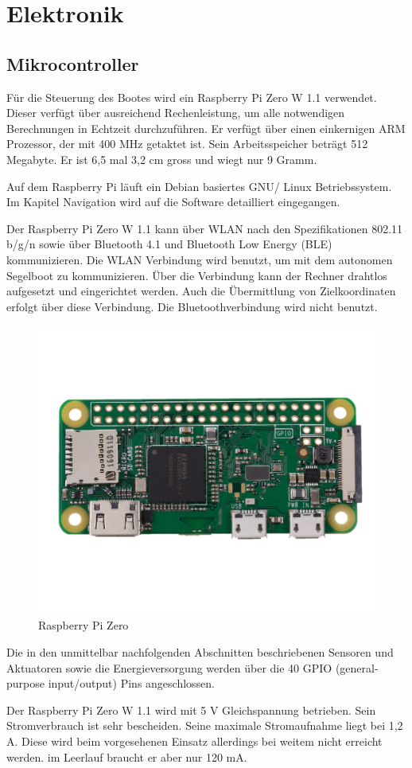 

\chapter{Elektronik}
\label{chap:elektronik}
\section{Mikrocontroller }
Für die Steuerung des Bootes wird ein Raspberry Pi Zero W 1.1 verwendet. Dieser verfügt über ausreichend Rechenleistung, um alle notwendigen Berechnungen in Echtzeit durchzuführen. Er verfügt über einen einkernigen ARM Prozessor, der mit 400 MHz getaktet ist. Sein Arbeitsspeicher beträgt 512 Megabyte. Er ist 6,5 mal 3,2 cm gross und wiegt nur 9 Gramm.

Auf dem Raspberry Pi läuft ein Debian basiertes GNU/ Linux Betriebssystem. Im Kapitel Navigation wird auf die Software detailliert eingegangen. 

Der Raspberry Pi Zero W 1.1 kann über WLAN nach den Spezifikationen 802.11 b/g/n sowie über Bluetooth 4.1 und Bluetooth Low Energy (BLE) kommunizieren. Die WLAN Verbindung wird benutzt, um mit dem autonomen Segelboot zu kommunizieren. Über die Verbindung kann der Rechner drahtlos aufgesetzt und eingerichtet werden. Auch die Übermittlung von Zielkoordinaten erfolgt über diese Verbindung. Die Bluetoothverbindung wird nicht benutzt.
\begin{figure}
    \centering
    \includegraphics[width=0.5\linewidth]{assets/raspi Zero.jpg}
    \caption{Raspberry Pi Zero }
    \label{fig:enter-label}
\end{figure}

Die in den unmittelbar nachfolgenden Abschnitten beschriebenen Sensoren und Aktuatoren sowie die Energieversorgung werden über die 40 GPIO (general-purpose input/output) Pins angeschlossen. 

Der Raspberry Pi Zero W 1.1 wird mit 5 V Gleichspannung betrieben. Sein Stromverbrauch ist sehr bescheiden. Seine maximale Stromaufnahme liegt bei 1,2 A. Diese wird beim vorgesehenen Einsatz allerdings bei weitem nicht erreicht werden.
\cite{noauthor_raspberry_2023} im Leerlauf braucht er aber nur 120 mA.
\cite{noauthor_stromverbrauch_nodate}

